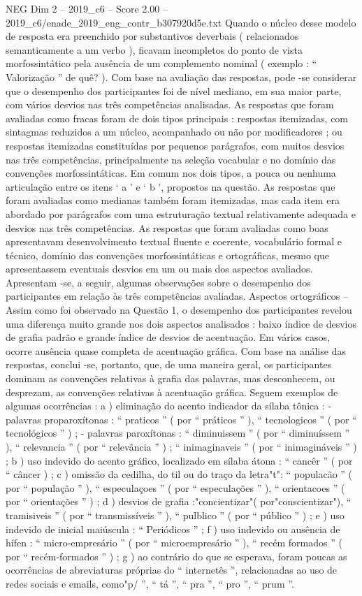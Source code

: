 \begin{textsample}{NEG Dim 2 – 2019\_c6 – Score 2.00 – 2019\_c6/enade\_2019\_eng\_contr\_b307920d5e.txt}
Quando o núcleo desse modelo de resposta era preenchido por substantivos deverbais ( relacionados semanticamente a um verbo ), ficavam incompletos do ponto de vista morfossintático pela ausência de um complemento nominal ( exemplo : “ Valorização ” de quê? ).
Com base na avaliação das respostas, pode -se considerar que o desempenho dos participantes foi de nível mediano, em sua maior parte, com vários desvios nas três competências analisadas.
As respostas que foram avaliadas como fracas foram de dois tipos principais : respostas itemizadas, com sintagmas reduzidos a um núcleo, acompanhado ou não por modificadores ; ou respostas itemizadas constituídas por pequenos parágrafos, com muitos desvios nas três competências, principalmente na seleção vocabular e no domínio das convenções morfossintáticas.
Em comum nos dois tipos, a pouca ou nenhuma articulação entre os itens ‘ a ’ e ‘ b ’, propostos na questão.
As respostas que foram avaliadas como medianas também foram itemizadas, mas cada item era abordado por parágrafos com uma estruturação textual relativamente adequada e desvios nas três competências.
As respostas que foram avaliadas como boas apresentavam desenvolvimento textual fluente e coerente, vocabulário formal e técnico, domínio das convenções morfossintáticas e ortográficas, mesmo que apresentassem eventuais desvios em um ou mais dos aspectos avaliados.
Apresentam -se, a seguir, algumas observações sobre o desempenho dos participantes em relação às três competências avaliadas.
Aspectos ortográficos – Assim como foi observado na Questão 1, o desempenho dos participantes revelou uma diferença muito grande nos dois aspectos analisados : baixo índice de desvios de grafia padrão e grande índice de desvios de acentuação.
Em vários casos, ocorre ausência quase completa de acentuação gráfica.
Com base na análise das respostas, conclui -se, portanto, que, de uma maneira geral, os participantes dominam as convenções relativas à grafia das palavras, mas desconhecem, ou desprezam, as convenções relativas à acentuação gráfica.
Seguem exemplos de algumas ocorrências : a ) eliminação do acento indicador da sílaba tônica : - palavras proparoxítonas : “ praticos ” ( por “ práticos ” ), “ tecnologicos ” ( por “ tecnológicos ” ) ; - palavras paroxítonas : “ diminuissem ” ( por “ diminuíssem ” ), “ relevancia ” ( por “ relevância ” ) ; “ inimaginaveis ” ( por “ inimagináveis ” ) ; b ) uso indevido do acento gráfico, localizado em sílaba átona : “ cancêr ” ( por “ câncer ) ; c ) omissão da cedilha, do til ou do traço da letra"t": “ populacão ” ( por “ população ” ), “ especulaçoes ” ( por “ especulações ” ), “ orientacoes ” ( por “ orientações ” ) ; d ) desvios de grafia :"concientizar"( por"conscientizar"), “ tramisiveis ” ( por “ transmissíveis ” ), “ pulblico ” ( por “ público ” ) ; e ) uso indevido de inicial maiúscula : “ Periódicos ” ; f ) uso indevido ou ausência de hífen : “ micro-empresário ” ( por “ microempresário ” ), “ recém formados ” ( por “ recém-formados ” ) ; g ) ao contrário do que se esperava, foram poucas as ocorrências de abreviaturas próprias do “ internetês ”, relacionadas ao uso de redes sociais e emails, como"p/ ”, “ tá ”, “ pra ”, “ pro ”, “ prum ”.

\end{textsample}
